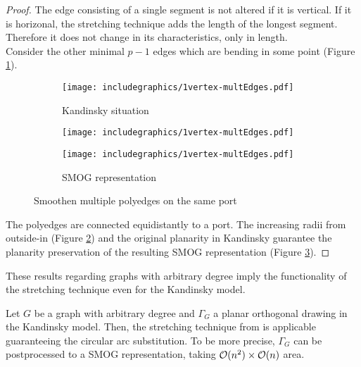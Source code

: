 \begin{proof}
	The edge consisting of a single segment is not altered if it is vertical. If it is horizonal, the stretching technique adds the length of the longest segment. Therefore it does not change in its characteristics, only in length.\\
	Consider the other minimal $p-1$ edges which are bending in some point (Figure \ref{im:1vme1}).\\
	\begin{figure}[H]
		\centering
		\begin{subfigure}{0.3\textwidth}
			\centering
			\texttt{[image: includegraphics/1vertex-multEdges.pdf]}
			\caption{Kandinsky situation}\label{im:1vme1}
		\end{subfigure}
	    \begin{subfigure}{0.3\textwidth}
		    \centering
		    \texttt{[image: includegraphics/1vertex-multEdges.pdf]}
		    \caption{}\label{im:1vme2}
	    \end{subfigure}
        \begin{subfigure}{0.3\textwidth}
	        \centering
	        \texttt{[image: includegraphics/1vertex-multEdges.pdf]}
	        \caption{SMOG representation}\label{im:1vme3}
        \end{subfigure}
        \caption{Smoothen multiple polyedges on the same port}\label{im:1vme}
	\end{figure}
The polyedges are connected equidistantly to a port. The increasing radii from outside-in (Figure \ref{im:1vme2}) and the original planarity in Kandinsky guarantee the planarity preservation of the resulting SMOG representation (Figure \ref{im:1vme3}).
\end{proof}
These results regarding graphs with arbitrary degree imply the functionality of the stretching technique even for the Kandinsky model. \cite[p. 582, Section 4.1]{SMOG}
\begin{corollary}
	Let $G$ be a graph with arbitrary degree and $\Gamma_G$ a planar orthogonal drawing in the Kandinsky model. Then, the stretching technique from \cite[p. 582, Section 4.1]{SMOG} is applicable guaranteeing the circular arc substitution. To be more precise, $\Gamma_G$ can be postprocessed to a SMOG representation, taking $\mathcal{O}(n^2) \times \mathcal{O}(n)$ area.
\end{corollary}
